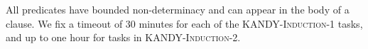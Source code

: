 %
%
All predicates have bounded non-determinacy and can appear in the body of a clause.
%
%
We fix a timeout of 30 minutes for each of the \textsc{KANDY-Induction-1} tasks, and up to one hour for tasks in \textsc{KANDY-Induction-2}.

